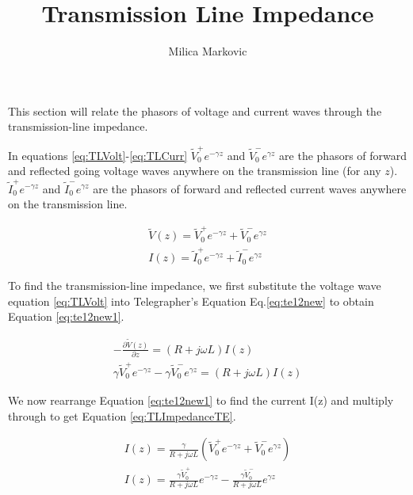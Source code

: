 \documentclass{ximera}
\title{Transmission Line Impedance}
\author{Milica Markovic}
\begin{document}
  
\begin{abstract}  

\end{abstract}  
\maketitle    






This section will relate the phasors of voltage and
current waves through the transmission-line impedance.





In equations \ref{eq:TLVolt}-\ref{eq:TLCurr} $\tilde{V}_0^+ e^{-\gamma z}$ and $\tilde{V}_0^- e^{\gamma z}$ are the phasors of forward and
reflected going voltage waves anywhere on the transmission line (for any $z$). $\tilde{I}_0^+ e^{-\gamma z}$ and $\tilde{I}_0^- e^{\gamma z}$ are the phasors of forward and
reflected current waves anywhere on the transmission line. 


\begin{eqnarray}
\tilde{V}(z)=\tilde{V}_0^+ e^{-\gamma z} + \tilde{V}_0^- e^{\gamma z}\label{eq:TLVolt} \\
I(z)=\tilde{I}_0^+ e^{-\gamma z} + \tilde{I}_0^- e^{\gamma z}\label{eq:TLCurr}
\end{eqnarray}




To find the transmission-line impedance, we first substitute the voltage wave equation \ref{eq:TLVolt} into Telegrapher's  Equation 
 Eq.\ref{eq:te12new}  to obtain Equation \ref{eq:te12new1}.




\begin{eqnarray}
-\frac{\partial \tilde{V}(z)}{\partial z} = (R+j\omega L) I(z) \label{eq:te12new} \\
\gamma \tilde{V}_0^+ e^{-\gamma z} - \gamma \tilde{V}_0^- e^{\gamma z} = (R+ j \omega
L) I(z) \label{eq:te12new1}
\end{eqnarray}

We now rearrange Equation \ref{eq:te12new1} to find the current I(z) and multiply through to get Equation \ref{eq:TLImpedanceTE}.

\begin{eqnarray}
I(z)=\frac{\gamma}{R+j\omega L} ( \tilde{V}_0^+ e^{-\gamma z} + \tilde{V}_0^-
 e^{\gamma z})  \nonumber  \\
I(z)=\frac{\gamma \tilde{V}_0^+}{R+ j \omega L} e^{-\gamma z} - \frac{\gamma \tilde{V}_0^-}{R+ j \omega L} e^{\gamma z} \label{eq:TLImpedanceTE}
\end{eqnarray}
\end{document}
